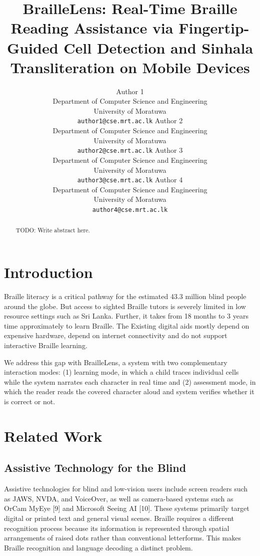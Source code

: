 \documentclass{article}
\title{BrailleLens: Real-Time Braille Reading Assistance via Fingertip-Guided
Cell Detection and Sinhala Transliteration on Mobile Devices}
\author{%
  Author 1 \\
  Department of Computer Science and Engineering \\
  University of Moratuwa \\
  \texttt{author1@cse.mrt.ac.lk}
  \And
  Author 2 \\
  Department of Computer Science and Engineering \\
  University of Moratuwa \\
  \texttt{author2@cse.mrt.ac.lk}
  \And
  Author 3 \\
  Department of Computer Science and Engineering \\
  University of Moratuwa \\
  \texttt{author3@cse.mrt.ac.lk}
  \And
  Author 4 \\
  Department of Computer Science and Engineering \\
  University of Moratuwa \\
  \texttt{author4@cse.mrt.ac.lk}
}
\begin{document}
\maketitle

\begin{abstract}
TODO: Write abstract here.
\end{abstract}


\section{Introduction}

Braille literacy is a critical pathway for the estimated 43.3 million blind people around the globe. But access to sighted Braille tutors is severely limited in low resource settings such as Sri Lanka. Further, it takes from 18 months to 3 years time approximately to learn Braille. The Existing digital aids mostly depend on expensive hardware, depend on internet connectivity and do not support interactive Braille learning.

We address this gap with BrailleLens, a system with two complementary interaction modes: (1) learning mode, in which a child traces individual cells while the system narrates each character in real time and (2) assessment mode, in which the reader reads the covered character aloud and system verifies whether it is correct or not.


\section{Related Work}


\subsection*{Assistive Technology for the Blind}

Assistive technologies for blind and low-vision users include screen readers such as JAWS, NVDA, and VoiceOver, as well as camera-based systems such as OrCam MyEye [9] and Microsoft Seeing AI [10]. These systems primarily target digital or printed text and general visual scenes. Braille requires a different recognition process because its information is represented through spatial arrangements of raised dots rather than conventional letterforms. This makes Braille recognition and language decoding a distinct problem.
\end{document}

